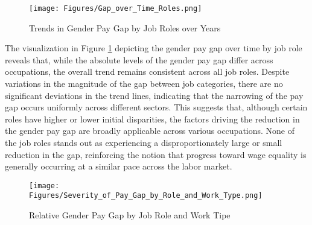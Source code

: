 \documentclass{article}
\begin{document}
\begin{figure}[h]
    \centering
    \texttt{[image: Figures/Gap\_over\_Time\_Roles.png]}
    \caption{Trends in Gender Pay Gap by Job Roles over Years}
    \label{fig:roles_trend}
\end{figure}

 The visualization in Figure \ref{fig:roles_trend} depicting the gender pay gap over time by job role reveals that, while the absolute levels of the gender pay gap differ across occupations, the overall trend remains consistent across all job roles. Despite variations in the magnitude of the gap between job categories, there are no significant deviations in the trend lines, indicating that the narrowing of the pay gap occurs uniformly across different sectors. This suggests that, although certain roles have higher or lower initial disparities, the factors driving the reduction in the gender pay gap are broadly applicable across various occupations. None of the job roles stands out as experiencing a disproportionately large or small reduction in the gap, reinforcing the notion that progress toward wage equality is generally occurring at a similar pace across the labor market.\\


\begin{figure}[h]
    \centering
    \texttt{[image: Figures/Severity\_of\_Pay\_Gap\_by\_Role\_and\_Work\_Type.png]}
    \caption{Relative Gender Pay Gap by Job Role and Work Tipe}
    \label{fig:heatmap}
\end{figure}
\end{document}
